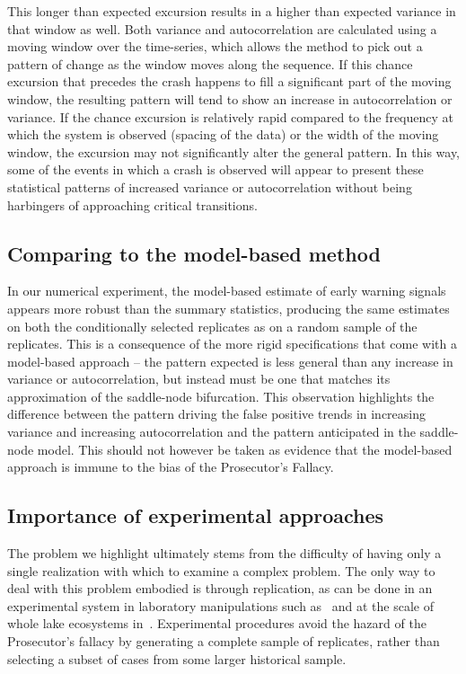 \documentclass[authoryear,review,12pt]{elsarticle}
\begin{document}
This longer than expected excursion results in a higher than expected
variance in that window as well. Both variance and autocorrelation are
calculated using a moving window over the time-series, which allows
the method to pick out a pattern of change as the window moves along
the sequence. If this chance excursion that precedes the crash happens
to fill a significant part of the moving window, the resulting pattern
will tend to show an increase in autocorrelation or variance.  If the
chance excursion is relatively rapid compared to the frequency at which
the system is observed (spacing of the data) or the width of the moving
window, the excursion may not significantly alter the general pattern.
In this way, some of the events in which a crash is observed will
appear to present these statistical patterns of increased variance
or autocorrelation without being harbingers of approaching critical
transitions.


\subsection{Comparing to the model-based method}

In our numerical experiment, the model-based estimate of early warning signals
appears more robust than the summary statistics, producing the same
estimates on both the conditionally selected replicates as on a random
sample of the replicates.  This is a consequence of the more rigid
specifications that come with a model-based approach -- the pattern
expected is less general than any increase in variance or autocorrelation,
but instead must be one that matches its approximation of the saddle-node
bifurcation. This observation highlights the difference between the
pattern driving the false positive trends in increasing variance and
increasing autocorrelation and the pattern anticipated in the saddle-node
model. This should not however be taken as evidence that the model-based
approach is immune to the bias of the Prosecutor's Fallacy.

\subsection{Importance of experimental approaches}
The problem we highlight ultimately stems from the difficulty of having
only a single realization with which to examine a complex problem.
The only way to deal with this problem embodied is through replication, as
can be done in an experimental system in laboratory manipulations
such as~\citet{Drake2010, Veraart2011, Dai2012} and at the scale of whole lake
ecosystems in~\citet{Carpenter2011}.  
Experimental procedures avoid the hazard of the Prosecutor's fallacy by
generating a complete sample of replicates, rather than selecting a subset
of cases from some larger historical sample.  
\end{document}
